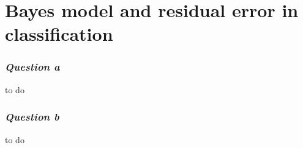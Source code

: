 \section{Bayes model and residual error in classification}

\subsubsection{{\it Question a}}
to do

\subsubsection{{\it Question b}}
to do
